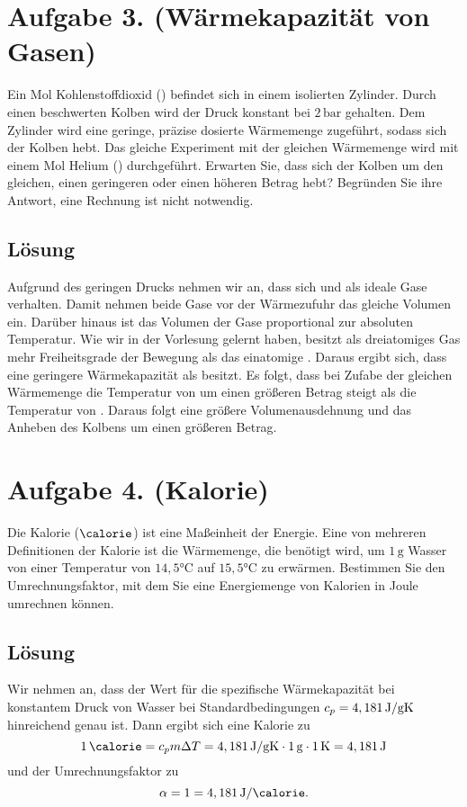 \documentclass[german,12pt]{homework}
\begin{document}
    \section*{Aufgabe 3. (Wärmekapazität von Gasen)}

    \begin{problem}
        Ein Mol Kohlenstoffdioxid () befindet sich in einem isolierten Zylinder. Durch einen beschwerten Kolben wird der Druck konstant bei \(2\,\si{\bar}\) gehalten. Dem Zylinder wird eine geringe, präzise dosierte Wärmemenge zugeführt, sodass sich der Kolben hebt. Das gleiche Experiment mit der gleichen Wärmemenge wird mit einem Mol Helium () durchgeführt. Erwarten Sie, dass sich der Kolben um den gleichen, einen geringeren oder einen höheren Betrag hebt? Begründen Sie ihre Antwort, eine Rechnung ist nicht notwendig.
    \end{problem}

    \subsection*{Lösung} Aufgrund des geringen Drucks nehmen wir an, dass sich  und  als ideale Gase verhalten. Damit nehmen beide Gase vor der Wärmezufuhr das gleiche Volumen ein. Darüber hinaus ist das Volumen der Gase proportional zur absoluten Temperatur. Wie wir in der Vorlesung gelernt haben, besitzt  als dreiatomiges Gas mehr Freiheitsgrade der Bewegung als das einatomige . Daraus ergibt sich, dass  eine geringere Wärmekapazität als  besitzt. Es folgt, dass bei Zufabe der gleichen Wärmemenge die Temperatur von  um einen größeren Betrag steigt als die Temperatur von . Daraus folgt eine größere Volumenausdehnung und das Anheben des Kolbens um einen größeren Betrag.

    \section*{Aufgabe 4. (Kalorie)}

    \begin{problem}
        Die Kalorie (\(\si{\calorie}\)) ist eine Maßeinheit der Energie. Eine von mehreren Definitionen der Kalorie ist die Wärmemenge, die benötigt wird, um \(1\,\si{\g}\) Wasser von einer Temperatur von \(14,5\si{\degreeCelsius}\) auf \(15,5\si{\degreeCelsius}\) zu erwärmen. Bestimmen Sie den Umrechnungsfaktor, mit dem Sie eine Energiemenge von Kalorien in Joule umrechnen können.
    \end{problem}

    \subsection*{Lösung} Wir nehmen an, dass der Wert für die spezifische Wärmekapazität bei konstantem Druck von Wasser bei Standardbedingungen \(c_p = 4,181\,\si{\joule\per{\g\kelvin}}\) hinreichend genau ist. Dann ergibt sich eine Kalorie zu
    \[1\,\si{\calorie} = c_pm{\Delta}T = 4,181\,\si{\joule\per{\g\kelvin}} \cdot 1\,\si{\g} \cdot 1\,\si{\kelvin} = 4,181\,\si{\joule}\]
    und der Umrechnungsfaktor zu
    \[\alpha = 1 = 4,181\,\si{\joule\per{\calorie}}.\]
\end{document}
